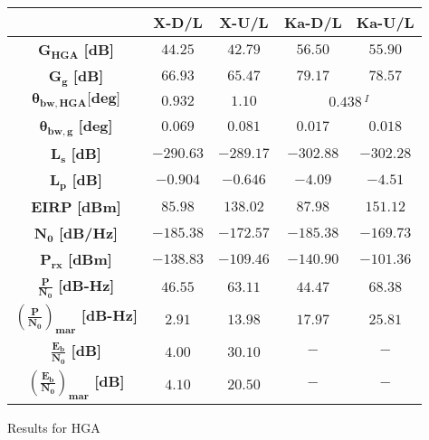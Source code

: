 \begin{minipage}{0.5\linewidth}
    \centering
    \captionsetup{type=table}
    \renewcommand{\arraystretch}{2}
    \setlength\extrarowheight{-1pt}
    \begin{tabular}{|c|c|c|c|c|}
        \hline
        & \textbf{X-D/L} & \textbf{X-U/L} & \textbf{Ka-D/L}& \textbf{Ka-U/L} \\
        \hline
        $\boldsymbol{G_{HGA}}$ \textbf{[dB]} & $44.25$ & $42.79$ & $56.50$ & $55.90$ \\
        \hline
        $\boldsymbol{G_g}$ \textbf{[dB]} & $66.93$ & $65.47$ & $79.17$ & $78.57$ \\
        \hline
        $\boldsymbol{\theta_{bw,HGA}} \textbf{[deg]}$  & $0.932$ & $1.10$ &\multicolumn{2}{c|}{$0.438 \,^{I}$}\\
        \hline
        $\boldsymbol{\theta_{bw,g}}$ \textbf{[deg]} & $0.069$ & $0.081$ & $0.017$ & $0.018$ \\
        \hline
        $\boldsymbol{L_{s}}$ \textbf{[dB]} & $-290.63$ & $-289.17$ & $-302.88$ & $-302.28$ \\
        \hline
        $\boldsymbol{L_{p}}$ \textbf{[dB]} & $-0.904$ & $-0.646$ & $-4.09$ & $-4.51$ \\
        \hline
        $\boldsymbol{EIRP}$ \textbf{[dBm]} & $85.98$ & $138.02$ & $87.98$ & $151.12$ \\
        \hline
        $\boldsymbol{N_{0}}$ \textbf{[dB/Hz]} & $-185.38$ & $-172.57$ & $-185.38$ & $-169.73$ \\
        \hline
        $\boldsymbol{P_{rx}}$ \textbf{[dBm]} & $-138.83$ & $-109.46$ & $-140.90$ & $-101.36$ \\
        \hline
        $\boldsymbol{\frac{P}{N_0}}$ \textbf{[dB-Hz]} & $46.55$ & $63.11$ & $44.47$ & $68.38$ \\
        \hline
        $\boldsymbol{\left(\frac{P}{N_0}\right)_{mar}}$ \textbf{[dB-Hz]} & $2.91$ & $13.98$ & $17.97$ & $25.81$ \\
        \hline
        $\boldsymbol{\frac{E_b}{N_0}}$ \textbf{[dB]} & $4.00$ & $30.10$ & $-$ & $-$ \\
        \hline
        $\boldsymbol{\left(\frac{E_b}{N_0}\right)_{mar}}$ \textbf{[dB]} & $4.10$ & $20.50$ & $-$ & $-$ \\
        \hline
    \end{tabular}
    \caption{Results for HGA}
    \label{table:results_HGA}
\end{minipage}

